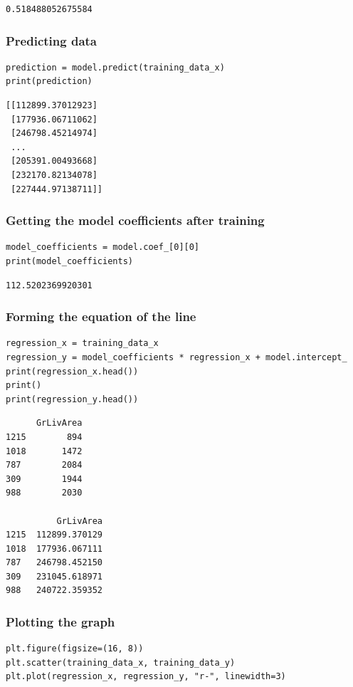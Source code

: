 \documentclass[11pt]{article}
\begin{document}
\label{org44b2f79}
\begin{verbatim}
0.518488052675584
\end{verbatim}
\subsubsection{Predicting data}
\label{sec:org3024c58}
\begin{verbatim}
prediction = model.predict(training_data_x)
print(prediction)
\end{verbatim}

\label{orgd60c157}
\begin{verbatim}
[[112899.37012923]
 [177936.06711062]
 [246798.45214974]
 ...
 [205391.00493668]
 [232170.82134078]
 [227444.97138711]]
\end{verbatim}
\subsubsection{Getting the model coefficients after training}
\label{sec:org3a5e54d}
\begin{verbatim}
model_coefficients = model.coef_[0][0]
print(model_coefficients)
\end{verbatim}

\label{org0617a02}
\begin{verbatim}
112.5202369920301
\end{verbatim}
\subsubsection{Forming the equation of the line}
\label{sec:org3c526c8}
\begin{verbatim}
regression_x = training_data_x
regression_y = model_coefficients * regression_x + model.intercept_
print(regression_x.head())
print()
print(regression_y.head())
\end{verbatim}

\label{orgff38f29}
\begin{verbatim}
      GrLivArea
1215        894
1018       1472
787        2084
309        1944
988        2030

          GrLivArea
1215  112899.370129
1018  177936.067111
787   246798.452150
309   231045.618971
988   240722.359352
\end{verbatim}

 \newpage
\subsubsection{Plotting the graph}
\label{sec:orgf3e225a}
\begin{verbatim}
plt.figure(figsize=(16, 8))
plt.scatter(training_data_x, training_data_y)
plt.plot(regression_x, regression_y, "r-", linewidth=3)
\end{verbatim}
\end{document}
